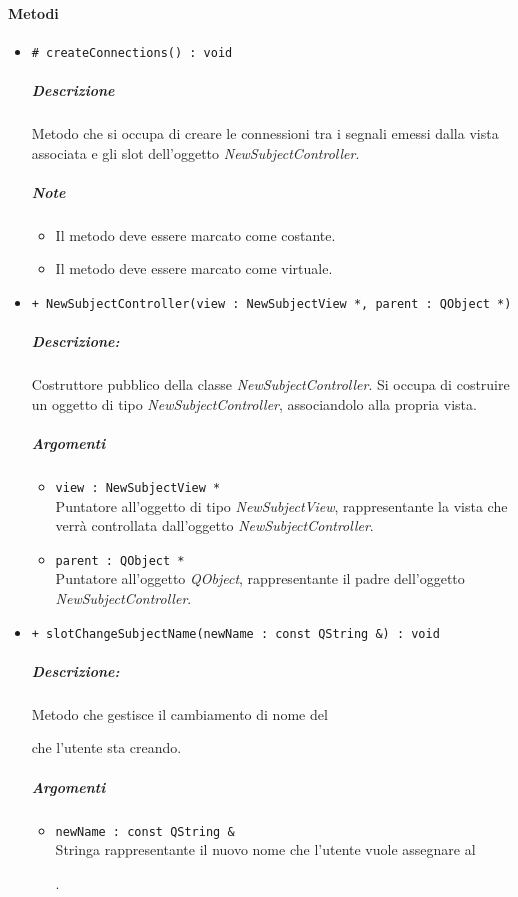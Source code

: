 	\paragraph{\color{black}Metodi}
		\begin{itemize}
			\item \color{blue} \verb!# createConnections() : void!
			\color{black}
			\subparagraph{Descrizione} Metodo che si occupa di creare le connessioni tra i segnali emessi dalla vista associata e gli slot\g{} dell'oggetto \textsl{NewSubjectController}.
			\subparagraph{Note}
			\begin{itemize}
				\item Il metodo deve essere marcato come costante.
				\item Il metodo deve essere marcato come virtuale.
			\end{itemize}
			\item \color{blue} \verb!+ NewSubjectController(view : NewSubjectView *, parent : QObject *)!
			\color{black}
			\subparagraph{Descrizione:} Costruttore pubblico della classe \textsl{NewSubjectController}. Si occupa di costruire un oggetto di tipo \textsl{NewSubjectController}, associandolo alla propria vista.
			\color{black}
			\subparagraph{Argomenti}
			\begin{itemize}
				\item \color{RoyalPurple} \verb!view : NewSubjectView *!\\				
\color{black} Puntatore all'oggetto di tipo \textsl{NewSubjectView}, rappresentante la vista che verrà controllata dall'oggetto \textsl{NewSubjectController}.
				\item \color{RoyalPurple} \verb!parent : QObject *!\\				
\color{black} Puntatore all'oggetto \textsl{QObject}, rappresentante il padre dell'oggetto \textsl{NewSubjectController}.
			\end{itemize}
			\item \color{blue} \verb!+ slotChangeSubjectName(newName : const QString &) : void!
			\color{black}
			\subparagraph{Descrizione:} Metodo che gestisce il cambiamento di nome del \subject{} che l'utente sta creando.
			\color{black}
			\subparagraph{Argomenti}
			\begin{itemize}
				\item \color{RoyalPurple} \verb!newName : const QString &!\\				
\color{black} Stringa rappresentante il nuovo nome che l'utente vuole assegnare al \subject{}.
			\end{itemize}

\end{itemize}
